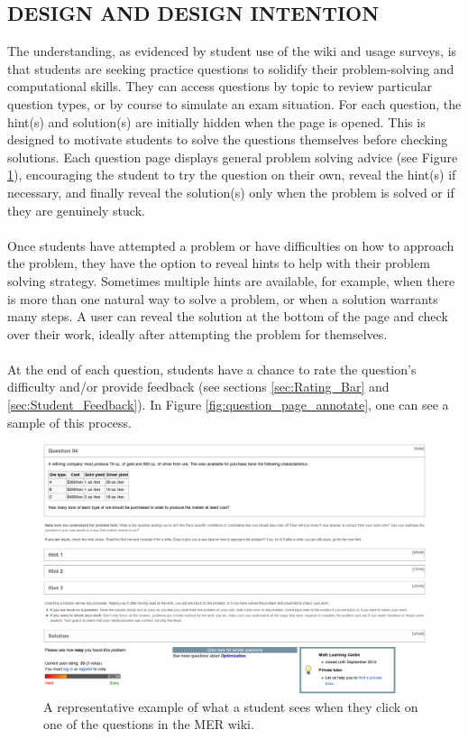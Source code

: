 \documentclass{primus}
\begin{document}
\subsection{DESIGN AND DESIGN INTENTION}\label{sec:Design_and_Design_Intention}
The understanding, as evidenced by student use of the wiki and usage surveys, is that students are seeking practice questions to solidify their problem-solving and computational skills. They can access questions by topic to review particular question types, or by course to simulate an exam situation. For each question, the hint(s) and solution(s) are initially hidden when the page is opened. This is designed to motivate students to solve the questions themselves before checking solutions. Each question page displays general problem solving advice (see Figure \ref{fig:question_page}), encouraging the student to try the question on their own, reveal the hint(s) if necessary, and finally reveal the solution(s) only when the problem is solved or if they are genuinely stuck.
\\\\
\noindent{}Once students have attempted a problem or have difficulties on how to approach the problem, they have the option to reveal hints to help with their problem solving strategy. Sometimes multiple hints are available, for example, when there is more than one natural way to solve a problem, or when a solution warrants many steps. A user can reveal the solution at the bottom of the page and check over their work, ideally after attempting the problem for themselves.
\\\\
\noindent{}At the end of each question, students have a chance to rate the question’s difficulty and/or provide feedback (see sections \ref{sec:Rating_Bar} and \ref{sec:Student_Feedback}). In Figure \ref{fig:question_page_annotate}, one can see a sample of this process.
\begin{figure}[H]
\centering
\includegraphics[width=\textwidth]{figs/Question_Page.png}
\caption{A representative example of what a student sees when they click on one of the questions in the MER wiki.}\label{fig:question_page}
\end{figure}
\end{document}
